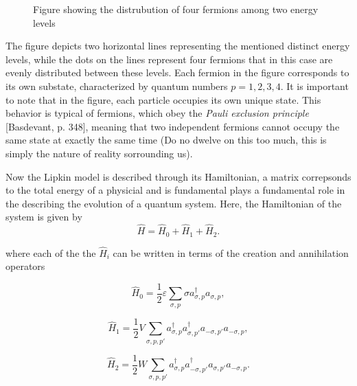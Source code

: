 \documentclass[onecolumn,10pt,cleanfoot]{asme2ej}
\begin{document}
\begin{figure}[H]
	\centering
	\caption{Figure showing the distrubution of four fermions among two energy levels}
\end{figure}

The figure depicts two horizontal lines representing the mentioned distinct energy levels, while the dots on the lines represent four fermions that in this case are evenly distributed between these levels. Each fermion in the figure corresponds to its own substate, characterized by quantum numbers $p = 1, 2, 3, 4$. It is important to note that in the figure, each particle occupies its own unique state. This behavior is typical of fermions, which obey the \textit{Pauli exclusion principle} [Basdevant, p. 348], meaning that two independent fermions cannot occupy the same state at exactly the same time (Do no dwelve on this too much, this is simply the nature of reality sorrounding us).

Now the Lipkin model is described through its Hamiltonian, a matrix correpsonds to the total energy of a physicial and is fundamental plays a fundamental role in the describing the evolution of a quantum system. Here, the Hamiltonian of the system is given by 
\begin{equation}
\hat{H} = \hat{H}_{0} + \hat{H}_{1} + \hat{H}_{2}.
\end{equation}

where each of the the $\hat{H}_{i}$ can be written in terms of the creation and annihilation operators

\begin{equation}
\hat{H}_0 = \frac{1}{2}\varepsilon\sum_{\sigma,p}\sigma a_{\sigma,p}^{\dagger}a_{\sigma,p},
\end{equation}

\begin{equation}
\hat{H}_1 = \frac{1}{2}V\sum_{\sigma,p,p'} a_{\sigma,p}^{\dagger}a_{\sigma,p'}^{\dagger}a_{-\sigma,p'}a_{-\sigma,p},
\end{equation}

\begin{equation}
\hat{H}_2 = \frac{1}{2}W\sum_{\sigma,p,p'} a_{\sigma,p}^{\dagger}a_{-\sigma,p'}^{\dagger}a_{\sigma,p'}a_{-\sigma,p}.
\end{equation}
\end{document}
